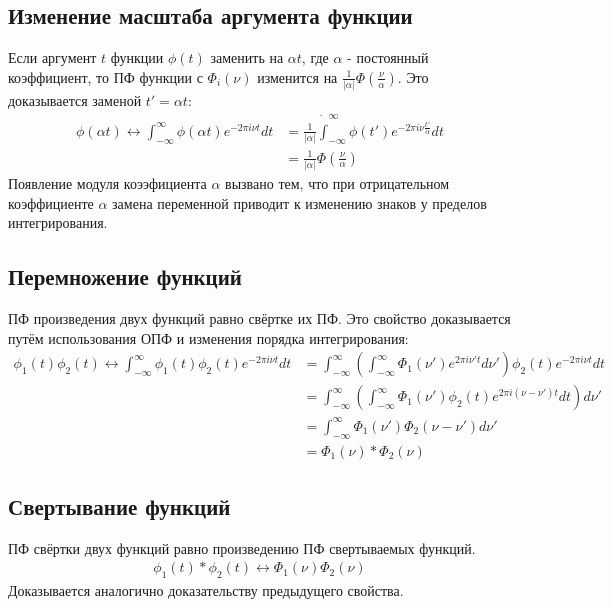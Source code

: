 \documentclass[a4paper, 12pt]{report}
\begin{document}
	\subsection{Изменение масштаба аргумента функции}
	Если аргумент $t$ функции $\phi(t)$ заменить на $\alpha t$, где $\alpha$ - постоянный коэффициент, то ПФ функции с $\Phi_i(\nu)$ изменится на $\frac{1}{|\alpha|} \Phi\left(\frac{\nu}{\alpha}\right)$. Это доказывается заменой $t' = \alpha t$:
	\[
        		\begin{aligned}
            		\phi(\alpha t) \leftrightarrow \int_{-\infty}^{\infty} \phi(\alpha t) e^{-2\pi i\nu t} dt
            		&= \frac{1}{|\alpha|} \dot \int_{-\infty}^{\infty} \phi(t') e^{-2\pi i\nu \frac{t'}{\alpha}} dt \\
			&= \frac{1}{|\alpha|} \Phi\left(\frac{\nu}{\alpha}\right)
        		\end{aligned}
    	\]
	Появление модуля коээфициента $\alpha$ вызвано тем, что при отрицательном коэффициенте $\alpha$ замена переменной приводит к изменению знаков у пределов интегрирования.

	\subsection{Перемножение функций}
	ПФ произведения двух функций равно свёртке их ПФ. Это свойство доказывается путём использования ОПФ и изменения порядка интегрирования:
	\[
        		\begin{aligned}
            		\phi_1(t) \phi_2(t) \leftrightarrow \int_{-\infty}^{\infty}\phi_1(t) \phi_2(t) e^{-2\pi i\nu t} dt
            		&= \int_{-\infty}^{\infty} \left( \int_{-\infty}^{\infty} \Phi_1(\nu') e^{2\pi i \nu' t} d\nu' \right) \phi_2(t) e^{-2\pi i\nu t} dt \\
           		&= \int_{-\infty}^{\infty} \left( \int_{-\infty}^{\infty} \Phi_1(\nu') \phi_2(t)  e^{2\pi i (\nu - \nu')t} dt \right) d\nu' \\
            		&= \int_{-\infty}^{\infty} \Phi_1(\nu') \Phi_2(\nu - \nu') d\nu' \\
			&= \Phi_1(\nu) * \Phi_2(\nu)
        		\end{aligned}
    	\]

	\subsection{Свертывание функций}
	ПФ свёртки двух функций равно произведению ПФ свертываемых функций.
	\[
        		\begin{aligned}
            		 \phi_1(t) * \phi_2(t) \leftrightarrow \Phi_1(\nu) \Phi_2(\nu)
        		\end{aligned}
    	\]
	Доказывается аналогично доказательству предыдущего свойства.
	
\end{document}
